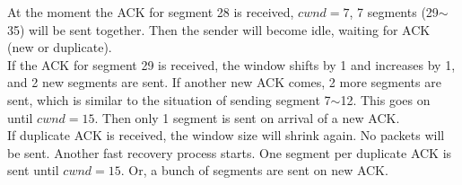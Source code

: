 \documentclass[a4paper]{article}
\begin{document}
\begin{description}
	At the moment the ACK for segment 28 is received, $cwnd=7$, 7 segments (29$\sim$35) will be sent together. Then the sender will become idle, waiting for ACK (new or duplicate).\\
	If the ACK for segment 29 is received, the window shifts by 1 and increases by 1, and 2 new segments are sent. If another new ACK comes, 2 more segments are sent, which is similar to the situation of sending segment 7$\sim$12. This goes on until $cwnd=15$. Then only 1 segment is sent on arrival of a new ACK.\\
	If duplicate ACK is received, the window size will shrink again. No packets will be sent. Another fast recovery process starts. One segment per duplicate ACK is sent until $cwnd=15$. Or, a bunch of segments are sent on new ACK.
\end{description}
\end{document}
